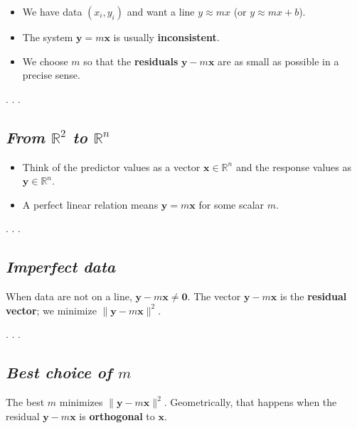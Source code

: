 \documentclass[
  letterpaper,
  DIV=11,
  numbers=noendperiod]{scrartcl}
\providecommand{\tightlist}{%
  \setlength{\itemsep}{0pt}\setlength{\parskip}{0pt}}\usepackage{longtable,booktabs,array}
\begin{document}
\begin{itemize}
\tightlist
\item
  We have data \((x_i, y_i)\) and want a line \(y \approx mx\) (or
  \(y \approx mx + b\)).
\item
  The system \(\mathbf{y} = m \mathbf{x}\) is usually
  \textbf{inconsistent}.
\item
  We choose \(m\) so that the \textbf{residuals}
  \(\mathbf{y} - m\mathbf{x}\) are as small as possible in a precise
  sense.
\end{itemize}

. . .

\subsection{\texorpdfstring{\emph{From \(\mathbb{R}^2\) to
\(\mathbb{R}^n\)}}{From \textbackslash mathbb\{R\}\^{}2 to \textbackslash mathbb\{R\}\^{}n}}\label{from-mathbbr2-to-mathbbrn}

\begin{itemize}
\tightlist
\item
  Think of the predictor values as a vector
  \(\mathbf{x} \in \mathbb{R}^n\) and the response values as
  \(\mathbf{y} \in \mathbb{R}^n\).
\item
  A perfect linear relation means \(\mathbf{y} = m \mathbf{x}\) for some
  scalar \(m\).
\end{itemize}

. . .

\subsection{\texorpdfstring{\emph{Imperfect
data}}{Imperfect data}}\label{imperfect-data}

When data are not on a line,
\(\mathbf{y} - m\mathbf{x} \neq \mathbf{0}\). The vector
\(\mathbf{y} - m\mathbf{x}\) is the \textbf{residual vector}; we
minimize \(\|\mathbf{y} - m\mathbf{x}\|^2\).

. . .

\subsection{\texorpdfstring{\emph{Best choice of
\(m\)}}{Best choice of m}}\label{best-choice-of-m}

The best \(m\) minimizes \(\|\mathbf{y} - m\mathbf{x}\|^2\).
Geometrically, that happens when the residual
\(\mathbf{y} - m\mathbf{x}\) is \textbf{orthogonal} to \(\mathbf{x}\).
\end{document}
